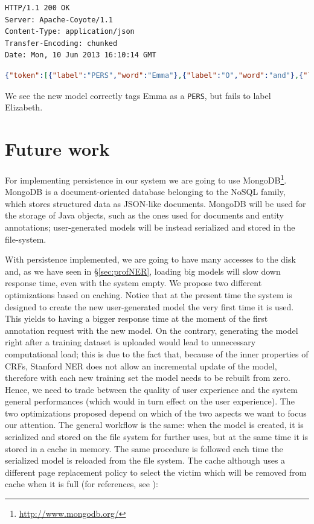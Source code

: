 \documentclass[a4paper,11pt]{report}
\begin{document}
\begin{enumerate}
\begin{lstlisting}
HTTP/1.1 200 OK
Server: Apache-Coyote/1.1
Content-Type: application/json
Transfer-Encoding: chunked
Date: Mon, 10 Jun 2013 16:10:14 GMT
\end{lstlisting}
\begin{lstlisting}[language=json]
{"token":[{"label":"PERS","word":"Emma"},{"label":"O","word":"and"},{"label":"O","word":"Elizabeth"},{"label":"O","word":"shared"},{"label":"O","word":"a"},{"label":"O","word":"dream"},{"label":"O","word":"."}]}
\end{lstlisting}
We see the new model correctly tags Emma as a \texttt{PERS}, but fails to label Elizabeth.
\end{enumerate}
\section{Future work}
For implementing persistence in our system we are going to use MongoDB\footnote{\url{http://www.mongodb.org/}}.
MongoDB is a document-oriented database belonging to the NoSQL family, which stores structured data as JSON-like documents. MongoDB will be used for the storage of Java objects, such as the ones used for documents and entity annotations; user-generated models will be instead serialized and stored in the file-system.

With persistence implemented, we are going to have many accesses to the disk and, as we have seen in \S \ref{sec:profNER}, loading big models will slow down response time, even with the system empty. We propose two different optimizations based on caching. Notice that at the present time the system is designed to create the new user-generated model the very first time it is used. This yields to having a bigger response time at the moment of the first annotation request with the new model. On the contrary, generating the model right after a training dataset is uploaded would lead to unnecessary computational load; this is due to the fact that, because of the inner properties of CRFs, Stanford NER does not allow an incremental update of the model, therefore with each new training set the model needs to be rebuilt from zero. Hence, we need to trade between the quality of user experience and the system general performances (which would in turn effect on the user experience).
The two optimizations proposed depend on which of the two aspects we want to focus our attention. The general workflow is the same: when the model is created, it is serialized and stored on the file system for further uses, but at the same time it is stored in a cache in memory. The same procedure is followed each time the serialized model is reloaded from the file system. The cache although uses a different page replacement policy to select the victim which will be removed from cache when it is full (for references, see \citet{silberOS}):
\end{document}
